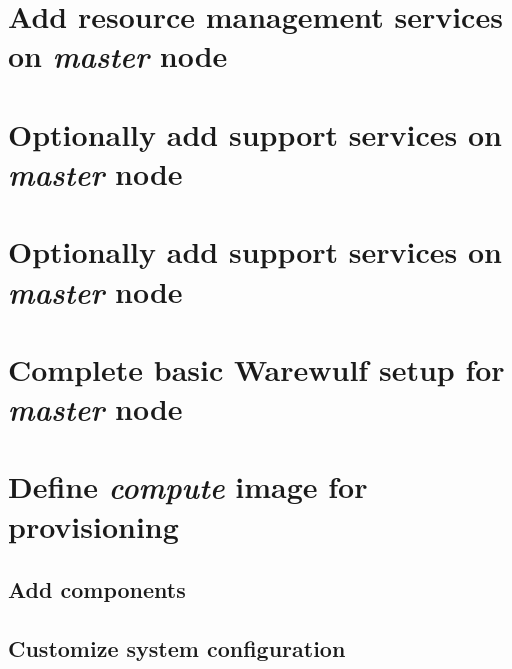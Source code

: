 \documentclass{ohpc-doc}
\begin{document}
\section{Add resource management services on {\em master} node} \label{sec:add_rm}


\section{Optionally add \InfiniBand{} support services on {\em master} node} \label{sec:add_ofed}


\section{Optionally add \OmniPath{} support services on {\em master} node} \label{sec:add_opa}


\section{Complete basic Warewulf setup for {\em master} node} \label{sec:setup_ww}



\section{Define {\em compute} image for provisioning}


\subsection{Add \OHPC{} components} \label{sec:add_components}



\subsection{Customize system configuration} \label{sec:master_customization}



\end{document}

